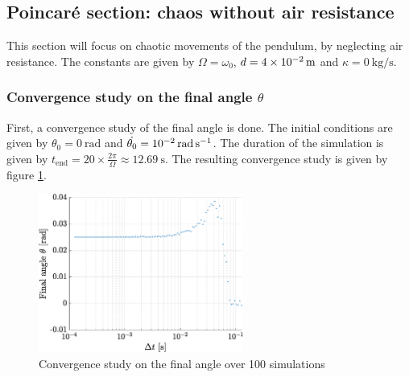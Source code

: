 \documentclass[a4paper,12pt,twoside]{article}
\begin{document}

\subsection{Poincaré section: chaos without air resistance}
This section will focus on chaotic movements of the pendulum, by neglecting air resistance.
The constants are given by $\Omega = \omega_0$, $d=\SI{4d-2}{\m}$ and $\kappa=\SI{0}{\kg\per\s}$.

\subsubsection{Convergence study on the final angle $\theta$}
First, a convergence study of the final angle is done.
The initial conditions are given by $\theta_0=\SI{0}{\radian}$ and $\dot{\theta_0}=\SI{d-2}{\radian\per\second}$.
The duration of the simulation is given by $t_\text{end} = 20\times\frac{2\pi}{\Omega} \approx \SI{12.69}{\s}$.
The resulting convergence study is given by figure \ref{fig:e-conv}.
\begin{figure}[h]
	\centering
	\includegraphics[width=0.6\textwidth]{graphs/e_conv.eps}
	\caption{Convergence study on the final angle over \num{100} simulations}
	\label{fig:e-conv}
\end{figure}

\end{document}
